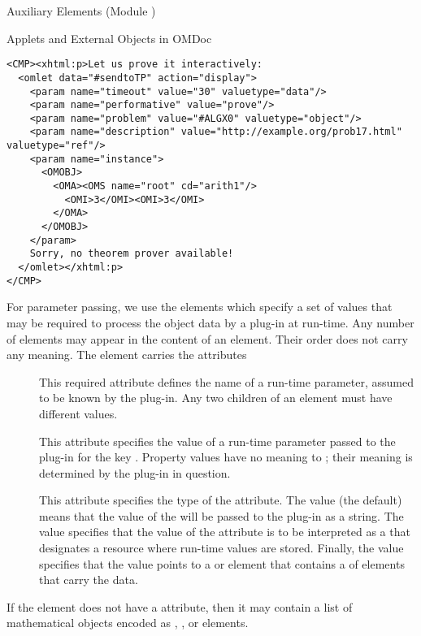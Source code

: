 \begin{tchapter}[id=ext,short=Auxiliary Elements]{Auxiliary Elements (Module {})}
\begin{tsection}[id=applets]{Applets and External Objects in OMDoc}
\begin{lstlisting}[label=lst:omlet2,mathescape,
  caption={An {\element{omlet}} for Connecting to a Theorem Prover},
  index={omlet}]
<CMP><xhtml:p>Let us prove it interactively:
  <omlet data="#sendtoTP" action="display">
    <param name="timeout" value="30" valuetype="data"/>
    <param name="performative" value="prove"/>
    <param name="problem" value="#ALGX0" valuetype="object"/>
    <param name="description" value="http://example.org/prob17.html" valuetype="ref"/>
    <param name="instance">
      <OMOBJ>
        <OMA><OMS name="root" cd="arith1"/>
          <OMI>3</OMI><OMI>3</OMI>
        </OMA>
      </OMOBJ>
    </param>   
    Sorry, no theorem prover available!
  </omlet></xhtml:p>
</CMP>
\end{lstlisting}

For parameter passing, we use the {} elements which specify a set of values
that may be required to process the object data by a plug-in at run-time. Any number of
{} elements may appear in the content of an {}
element. Their order does not carry any meaning. The {} element carries the
attributes
\begin{description}
\item[{}] This required attribute defines the name of a
  run-time parameter, assumed to be known by the plug-in. Any two {}
  children of an {} element must have different
  {} values.
\item[{}] This attribute specifies the value of a run-time
  parameter passed to the plug-in for the key {}. Property
  values have no meaning to {\omdoc}; their meaning is determined by the plug-in in
  question.
\item[{}] This attribute specifies the type of the
  {} attribute. The value
  {} (the default) means that the value of the
  {} will be passed to the plug-in as a string.  The value
  {} specifies that the value of the
  {} attribute is to be interpreted as a
  {} that designates a resource where run-time values are
  stored. Finally, the value {} specifies that
  the {} value points to a {} or
  {} element that contains a {} of
  {} elements that carry the data.
\end{description}
If the {} element does not have a {}
attribute, then it may contain a list of mathematical objects encoded as
{}, {}, or {} elements.
\end{tsection}


\end{tchapter}
